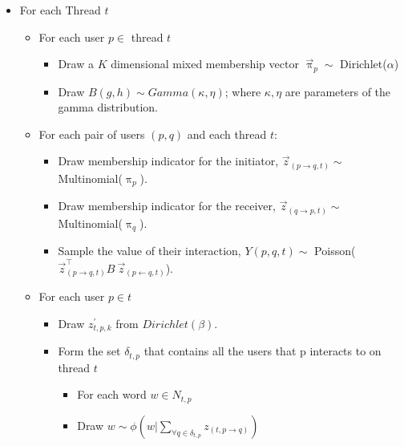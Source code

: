 \documentclass{sig-alternate}
\begin{document}
\begin{itemize}
  \item For each Thread $t$
\begin{itemize}
  \item For each user $p \in$ thread $t$
  \begin{itemize}
    \item Draw a $K$ dimensional mixed membership vector 
    $\overset{\rightarrow}{\uppi}_{p} \sim$ Dirichlet($\alpha$)

    \item Draw $B(g,h) \sim Gamma(\kappa,\eta)$; where $\kappa, \eta$ are
    parameters of the gamma distribution.
  \end{itemize}

  \item For each pair of users $(p, q)$ and each thread $t$:
  \begin{itemize}
    \item Draw membership indicator for the initiator, 
    $\overset{\rightarrow}{z}_{(p \rightarrow q,t)} \sim$
    Multinomial($\uppi_{p}$).
    \item Draw membership indicator for the receiver,
    $\overset{\rightarrow}{z}_{(q \rightarrow p,t)} \sim$
    Multinomial($\uppi_{q}$).
    \item Sample the value of their interaction, $Y(p,q,t) \sim$
    Poisson(${\overset{\rightarrow}{z}}^{\top}_{(p \rightarrow q,t)}
    B~\overset{\rightarrow}{z}_{(p \leftarrow q,t)}$). 
	\end{itemize}
	\item For each user $p \in t$
	\begin{itemize}
	  \item Draw $z^{'}_{t,p,k}$ from $Dirichlet(\beta)$.
	  \item Form the set $\delta_{t,p}$ that contains all the users that p
	  interacts to on thread $t$
	  \begin{itemize}
	    \item For each word $w \in N_{t,p}$ 
	    \item Draw $w \sim \phi(w|\sum_{\forall q\in \delta_{t,p}} z_{(t,p
	    \rightarrow q)}) $
	  \end{itemize}
  \end{itemize}
\end{itemize}  
\end{itemize}
\end{document}
